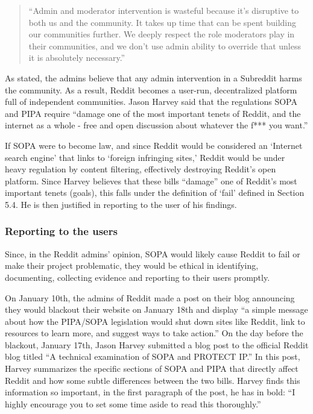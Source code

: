 \documentclass[11pt]{article}
\begin{document}
\begin{multicols}{2}
\begin{quote}``Admin and moderator intervention is wasteful because it's disruptive to both us and the community. It takes up time that can be spent building our communities further. We deeply respect the role moderators play in their communities, and we don't use admin ability to override that unless it is absolutely necessary.''\cite{how-reddit-works}\end{quote}

As stated, the admins believe that any admin intervention in a Subreddit harms the community. As a result, Reddit becomes a user-run, decentralized platform full of independent communities. Jason Harvey said that the regulations SOPA and PIPA require ``damage one of the most important tenets of Reddit, and the internet as a whole - free and open discussion about whatever the f*** you want.''\cite{reddit-sopapipa-explaination}

If SOPA were to become law, and since Reddit would be considered an `Internet search engine' that links to `foreign infringing sites,' Reddit would be under heavy regulation by content filtering, effectively destroying Reddit's open platform. Since Harvey believes that these bills ``damage'' one of Reddit's most important tenets (goals), this falls under the definition of `fail' defined in Section 5.4. He is then justified in reporting to the user of his findings.

   \subsubsection{Reporting to the users}

Since, in the Reddit admins' opinion, SOPA would likely cause Reddit to fail or make their project problematic, they would be ethical in identifying, documenting, collecting evidence and reporting to their users promptly.

On January 10th, the admins of Reddit made a post on their blog announcing they would blackout their website on January 18th and display ``a simple message about how the PIPA/SOPA legislation would shut down sites like Reddit, link to resources to learn more, and suggest ways to take action.''\cite{reddit-blackout-blog} On the day before the blackout, January 17th, Jason Harvey submitted a blog post to the official Reddit blog titled ``A technical examination of SOPA and PROTECT IP.''\cite{reddit-sopapipa-explaination} In this post, Harvey summarizes the specific sections of SOPA and PIPA that directly affect Reddit and how some subtle differences between the two bills. Harvey finds this information so important, in the first paragraph of the post, he has in bold: ``I highly encourage you to set some time aside to read this thoroughly.''


\end{multicols}
\end{document}
